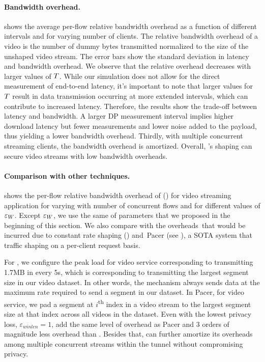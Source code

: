 \paragraph{Bandwidth overhead.}
 shows the average per-flow relative bandwidth overhead as a function of different intervals and for varying number of clients.
The relative bandwidth overhead of a video is the number of dummy bytes transmitted normalized to the size of the unshaped video stream.
The error bars show the standard deviation in latency and bandwidth overhead.
We observe that the relative overhead decreases with larger values of $T$.
While our simulation does not allow for the direct measurement of end-to-end latency, it's important to note that larger values for $T$ result in data transmission occurring at more extended intervals, which can contribute to increased latency.
Therefore, the results show the trade-off between latency and bandwidth. 
A larger DP measurement interval implies higher download latency but fewer measurements and lower noise added to the payload, thus yielding a lower bandwidth overhead.
Thirdly, with multiple concurrent streaming clients, the bandwidth overhead is amortized.
Overall, {\sys}'s shaping can secure video streams with low bandwidth overheads.


\paragraph{Comparison with other techniques.}
 shows the per-flow relative bandwidth overhead of {\sys} ({\ns}) for video streaming application for varying with number of concurrent flows and for different values of $\varepsilon_{W}$.
Except $\varepsilon_{W}$, we use the same of parameters that we proposed in the beginning of this section.
We also compare with the overheads~that would be incurred due to constant rate
shaping ({\constshape}) and~Pacer \cite{mehta2022pacer} (see ), a SOTA system
that traffic shaping on a per-client request basis.

For {\constshape}, we configure the peak load for video service corresponding to
transmitting 1.7MB in every 5s, which is corresponding to transmitting the largest segment size in our video dataset. In other words, the {\constshape} mechanism always sends data at the maximum rate required to send a segment in our dataset.
In Pacer, for video service, we pad a segment at $i$\textsuperscript{th} index
in a video stream to the largest segment size at that index across all videos in the dataset. 
Even with the lowest privacy loss, $\varepsilon_{winlen}=1$, {\ns} add the same level of overhead as Pacer and 3 orders of magnitude less overhead than {\constshape}.  
Besides that, {\ns} can further amortize its overheads
among multiple concurrent streams within the tunnel without compromising privacy.





